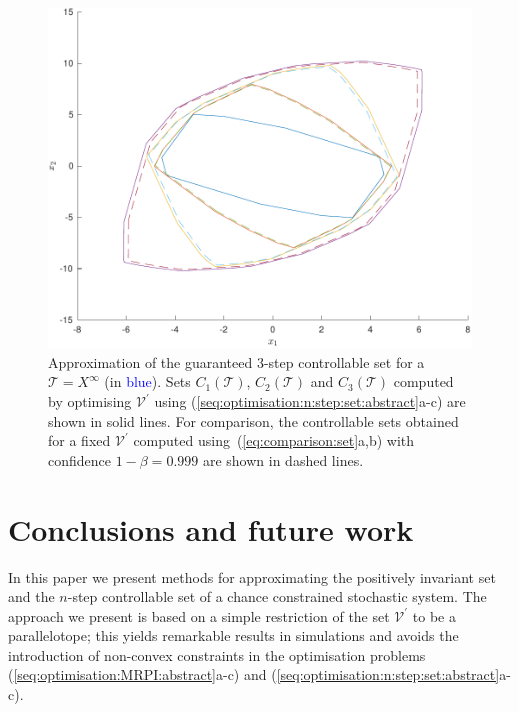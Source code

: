 \documentclass{ifacconf}
\providecommand{\V}{\mathcal V}
\providecommand{\T}{\mathcal T}
\begin{document}
\begin{figure}[ht]
\includegraphics[width=.99\linewidth]{NStepSetOptimised.pdf}
\caption{Approximation of the guaranteed 3-step controllable set for a $\T=X^\infty$ (in \textcolor{blue}{blue}). Sets $C_1(\T)$, $C_2(\T)$ and $C_3(\T)$ computed by optimising $\V^\prime$ using  (\ref{seq:optimisation:n:step:set:abstract}a-c) are shown in solid lines. For comparison, the controllable sets obtained for a fixed $\V^\prime$ computed using~(\ref{eq:comparison:set}a,b) with 
confidence $1-\beta= 0.999$ are shown in dashed lines.}
\label{fig:n:step:controllable:set}
\vspace{4mm}\end{figure}



\section{Conclusions and future work}\label{sec:conclusion}
%
%
In this paper we present methods for approximating the positively invariant set and the $n$-step controllable set of a chance constrained stochastic system.
%
%
The approach we present is based on a simple restriction of the set $\V^\prime$ to be a parallelotope; this yields remarkable results in simulations and avoids the introduction of non-convex constraints in the optimisation problems (\ref{seq:optimisation:MRPI:abstract}a-c) and \mbox{(\ref{seq:optimisation:n:step:set:abstract}a-c)}.
\end{document}
